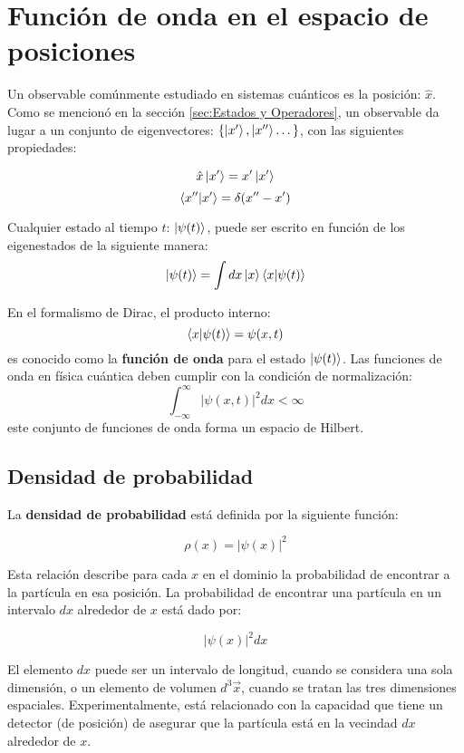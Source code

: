 \section{Función de onda en el espacio de posiciones}
Un observable comúnmente estudiado en sistemas cuánticos es la posición: $\hat{x}$. Como se mencionó en la sección \autoref{sec:Estados y Operadores}, un observable da lugar a un conjunto de eigenvectores: $\{\ket{x'}, \ket{x''}\dots \}$, con las siguientes propiedades:

$$\hat{x}\ket{x'} = x'\ket{x'}$$
$$\bra{x''}\ket{x'}=\delta(x''-x')$$

Cualquier estado al tiempo $t$: $\ket{\psi(t)}$, puede ser escrito en función de los eigenestados de la siguiente manera:
$$\ket{\psi(t)} = \int dx\ket{x}\bra{x}\ket{\psi(t)}$$

En el formalismo de Dirac, el producto interno:
$$\bra{x}\ket{\psi(t)} = \psi(x,t)$$
es conocido como la \textbf{función de onda} para el estado $\ket{\psi(t)}$. Las funciones de onda en física cuántica deben cumplir con la condición de normalización:
$$\int_{-\infty}^{\infty}| \psi(x,t)|^2dx < \infty $$
este conjunto de funciones de onda forma un espacio de Hilbert.

\subsection{Densidad de probabilidad}

La \textbf{densidad de probabilidad} está definida por la siguiente función:

\begin{equation}
 \label{eq:density probablity}
\rho(x)=|\psi(x)|^2
\end{equation}

Esta relación describe para cada $x$ en el dominio la probabilidad de encontrar a la partícula en esa posición. La probabilidad de encontrar una partícula en un intervalo $dx$ alrededor de $x$ está dado por:

 $$|\psi(x)|^2 dx $$

 El elemento $dx$ puede ser un intervalo de longitud, cuando se considera una sola dimensión, o un elemento de volumen $d^3\vec{x}$, cuando se tratan las tres dimensiones espaciales. Experimentalmente, está relacionado con la capacidad que tiene un detector (de posición) de asegurar que la partícula está en la vecindad $dx$ alrededor de $x$.



